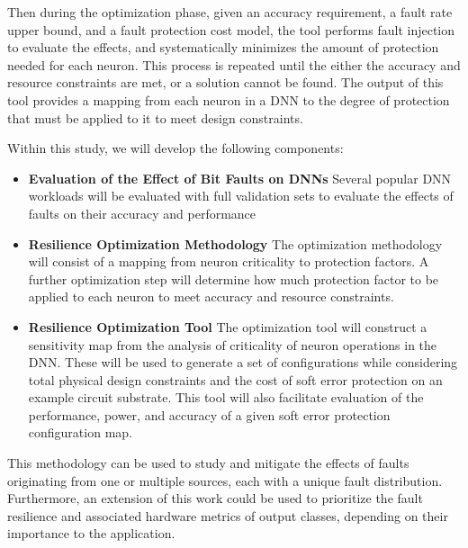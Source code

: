 Then during the optimization phase, given an accuracy requirement, a fault rate upper bound, and a fault protection cost model, the tool performs fault injection to evaluate the effects, and systematically minimizes the amount of protection needed for each neuron.
This process is repeated until the either the accuracy and resource constraints are met, or a solution cannot be found.
The output of this tool provides a mapping from each neuron in a DNN to the degree of protection that must be applied to it to meet design constraints.

Within this study, we will develop the following components:

\begin{itemize}
\item \textbf{Evaluation of the Effect of Bit Faults on DNNs} Several popular DNN workloads will be evaluated with full validation sets to evaluate the effects of faults on their accuracy and performance
\item \textbf{Resilience Optimization Methodology} The optimization methodology will consist of a mapping from neuron criticality to protection factors.
A further optimization step will determine how much protection factor to be applied to each neuron to meet accuracy and resource constraints.
\item \textbf{Resilience Optimization Tool}
The optimization tool will construct a sensitivity map from the analysis of criticality of neuron operations in the DNN.
These will be used to generate a set of configurations while considering total physical design constraints and the cost of soft error protection on an example circuit substrate.
This tool will also facilitate evaluation of the performance, power, and accuracy of a given soft error protection configuration map.
\end{itemize}

This methodology can be used to study and mitigate the effects of faults originating from one or multiple sources, each with a unique fault distribution. Furthermore, an extension of this work could be used to prioritize the fault resilience and associated hardware metrics of output classes, depending on their importance to the application.


